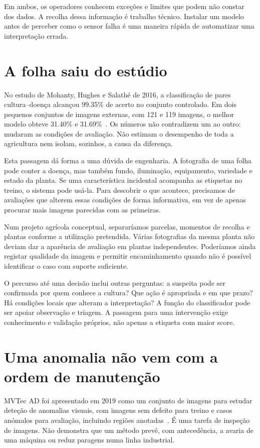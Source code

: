 Em ambos, os operadores conhecem exceções e limites que podem não constar dos dados. A recolha dessa informação é trabalho técnico. Instalar um modelo antes de perceber como o sensor falha é uma maneira rápida de automatizar uma interpretação errada.

\section{A folha saiu do estúdio}
No estudo de Mohanty, Hughes e Salathé de 2016, a classificação de pares cultura--doença alcançou 99.35\% de acerto no conjunto controlado. Em dois pequenos conjuntos de imagens externas, com 121 e 119 imagens, o melhor modelo obteve 31.40\% e 31.69\%~\citep{mohanty2016}. Os números não contradizem um ao outro: mudaram as condições de avaliação. Não estimam o desempenho de toda a agricultura nem isolam, sozinhos, a causa da diferença.

Esta passagem dá forma a uma dúvida de engenharia. A fotografia de uma folha pode conter a doença, mas também fundo, iluminação, equipamento, variedade e estado da planta. Se uma característica incidental acompanha as etiquetas no treino, o sistema pode usá-la. Para descobrir o que acontece, precisamos de avaliações que alterem essas condições de forma informativa, em vez de apenas procurar mais imagens parecidas com as primeiras.

Num projeto agrícola conceptual, separaríamos parcelas, momentos de recolha e plantas conforme a utilização pretendida. Várias fotografias da mesma planta não deviam dar a aparência de avaliação em plantas independentes. Poderíamos ainda registar qualidade da imagem e permitir encaminhamento quando não é possível identificar o caso com suporte suficiente.

O percurso até uma decisão inclui outras perguntas: a suspeita pode ser confirmada por quem conhece a cultura? Que ação é apropriada e em que prazo? Há condições locais que alteram a interpretação? A função do classificador pode ser apoiar observação e triagem. A passagem para uma intervenção exige conhecimento e validação próprios, não apenas a etiqueta com maior score.

\section{Uma anomalia não vem com a ordem de manutenção}
MVTec AD foi apresentado em 2019 como um conjunto de imagens para estudar deteção de anomalias visuais, com imagens sem defeito para treino e casos anómalos para avaliação, incluindo regiões anotadas~\citep{bergmann2019}. É uma tarefa de inspeção de imagens. Não demonstra que um método prevê, com antecedência, a avaria de uma máquina ou reduz paragens numa linha industrial.

